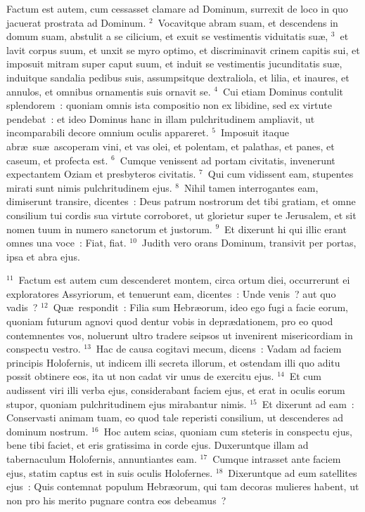 \bchapter
\lettrine[lines=3,image=true,loversize=0.05,lraise=-0.03]{F}{}actum est autem, cum cessasset clamare ad Dominum, surrexit de loco in quo jacuerat prostrata ad Dominum.
${}^{2}$~Vocavitque abram suam, et descendens in domum suam, abstulit a se cilicium, et exuit se vestimentis viduitatis su\ae ,
${}^{3}$~et lavit corpus suum, et unxit se myro optimo, et discriminavit crinem capitis sui, et imposuit mitram super caput suum, et induit se vestimentis jucunditatis su\ae , induitque sandalia pedibus suis, assumpsitque dextraliola, et lilia, et inaures, et annulos, et omnibus ornamentis suis ornavit se.
${}^{4}$~Cui etiam Dominus contulit splendorem~: quoniam omnis ista compositio non ex libidine, sed ex virtute pendebat~: et ideo Dominus hanc in illam pulchritudinem ampliavit, ut incomparabili decore omnium oculis appareret.
${}^{5}$~Imposuit itaque abr\ae\ su\ae\ ascoperam vini, et vas olei, et polentam, et palathas, et panes, et caseum, et profecta est.
${}^{6}$~Cumque venissent ad portam civitatis, invenerunt expectantem Oziam et presbyteros civitatis.
${}^{7}$~Qui cum vidissent eam, stupentes mirati sunt nimis pulchritudinem ejus.
${}^{8}$~Nihil tamen interrogantes eam, dimiserunt transire, dicentes~: Deus patrum nostrorum det tibi gratiam, et omne consilium tui cordis sua virtute corroboret, ut glorietur super te Jerusalem, et sit nomen tuum in numero sanctorum et justorum.
${}^{9}$~Et dixerunt hi qui illic erant omnes una voce~: Fiat, fiat.
${}^{10}$~Judith vero orans Dominum, transivit per portas, ipsa et abra ejus.


${}^{11}$~Factum est autem cum descenderet montem, circa ortum diei, occurrerunt ei exploratores Assyriorum, et tenuerunt eam, dicentes~: Unde venis~? aut quo vadis~?
${}^{12}$~Qu\ae\ respondit~: Filia sum Hebr\ae orum, ideo ego fugi a facie eorum, quoniam futurum agnovi quod dentur vobis in depr\ae dationem, pro eo quod contemnentes vos, noluerunt ultro tradere seipsos ut invenirent misericordiam in conspectu vestro.
${}^{13}$~Hac de causa cogitavi mecum, dicens~: Vadam ad faciem principis Holofernis, ut indicem illi secreta illorum, et ostendam illi quo aditu possit obtinere eos, ita ut non cadat vir unus de exercitu ejus.
${}^{14}$~Et cum audissent viri illi verba ejus, considerabant faciem ejus, et erat in oculis eorum stupor, quoniam pulchritudinem ejus mirabantur nimis.
${}^{15}$~Et dixerunt ad eam~: Conservasti animam tuam, eo quod tale reperisti consilium, ut descenderes ad dominum nostrum.
${}^{16}$~Hoc autem scias, quoniam cum steteris in conspectu ejus, bene tibi faciet, et eris gratissima in corde ejus. Duxeruntque illam ad tabernaculum Holofernis, annuntiantes eam.
${}^{17}$~Cumque intrasset ante faciem ejus, statim captus est in suis oculis Holofernes.
${}^{18}$~Dixeruntque ad eum satellites ejus~: Quis contemnat populum Hebr\ae orum, qui tam decoras mulieres habent, ut non pro his merito pugnare contra eos debeamus~?


